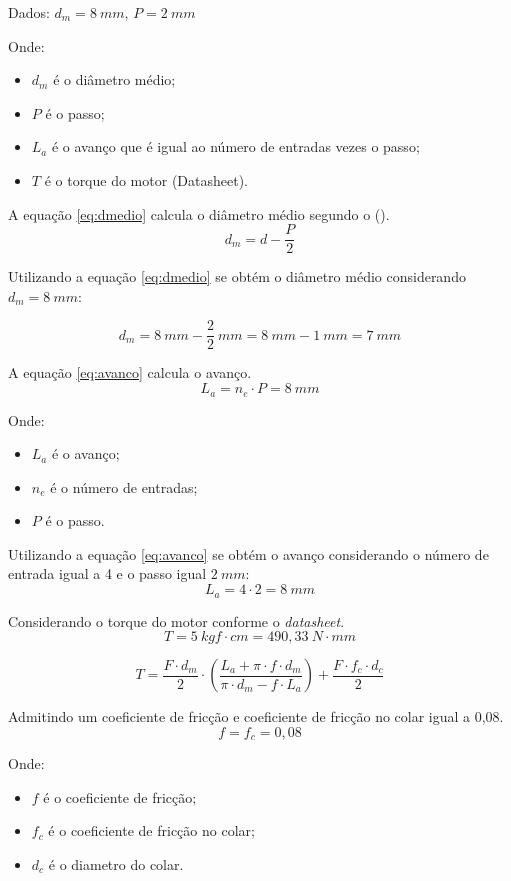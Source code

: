 Dados:
$d_{m} = 8~mm$, $P = 2~mm$

Onde:
\begin{itemize}
    \item $d_{m}$ é o diâmetro médio;
    \item $P$ é o passo;
    \item $L_{a}$ é o avanço que é igual ao número de entradas vezes o passo;
    \item $T$ é o torque do motor (Datasheet).
\end{itemize}

A equação \ref{eq:dmedio} calcula o diâmetro médio segundo o \citeauthor{budynas2016elementos} (\citeyear{budynas2016elementos}).
\begin{equation}\label{eq:dmedio}
    d_{m} = d - \frac{P}{2}
\end{equation}

Utilizando a equação \ref{eq:dmedio} se obtém o diâmetro médio considerando $d_{m} = 8~mm$:

$$d_{m} = 8~mm - \frac{2}{2}~mm = 8~mm - 1~mm = 7~mm$$

A equação \ref{eq:avanco} calcula o avanço.
\begin{equation}\label{eq:avanco}
    L_{a} = n_{e} \cdot P = 8~mm
\end{equation}

Onde:
\begin{itemize}
    \item $L_{a}$ é o avanço;
    \item $n_{e}$ é o número de entradas;
    \item $P$ é o passo.
\end{itemize}

Utilizando a equação \ref{eq:avanco} se obtém o avanço considerando o número de entrada igual a 4 e o passo igual $2~mm$:
$$L_{a} = 4 \cdot 2 = 8~mm$$ 

Considerando o torque do motor conforme o \textit{datasheet}.
$$T = 5~kgf \cdot cm = 490,33~N \cdot mm$$

\begin{equation}\label{eq:torque}
T = \frac{F \cdot d_{m}}{2} \cdot (\frac{L_{a} + \pi \cdot f \cdot d_{m}}{\pi \cdot d_{m} - f \cdot L_{a}}) + \frac{F \cdot f_{c} \cdot d_{c}}{2}
\end{equation}

Admitindo um coeficiente de fricção e coeficiente de fricção no colar igual a 0,08.
$$f = f_{c} = 0,08$$

Onde:
\begin{itemize}
    \item $f$ é o coeficiente de fricção;
    \item $f_{c}$ é o coeficiente de fricção no colar;
    \item $d_{c}$ é o diametro do colar.
\end{itemize}

